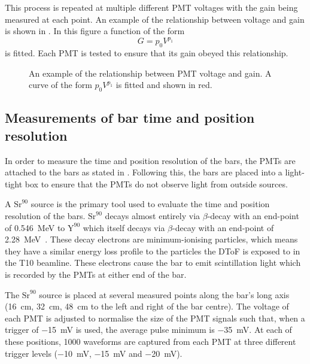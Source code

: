 This process is repeated at multiple different PMT voltages with the gain being measured at each point.
An example of the relationship between voltage and gain is shown in .
In this figure a function of the form
\begin{equation}
  G = p_{0} V^{p_{1}}
\end{equation}
is fitted.
Each PMT is tested to ensure that its gain obeyed this relationship.

\begin{figure}[h]
  \centering
  \begin{adjustbox}{max totalsize={.8\textwidth}, center}
    
  \end{adjustbox}
  \caption[Example of relationship between PMT voltage and gain]{An example of the relationship between PMT voltage and gain. A curve of the form $p_{0} V^{p_{1}}$ is fitted and shown in red.}
  \label{fig:gainEx}
\end{figure}

\subsection{Measurements of bar time and position resolution}
\label{ch:hptpc_dtof_characterisation:characterisation:barRes}

In order to measure the time and position resolution of the bars, the PMTs are attached to the bars as stated in .
Following this, the bars are placed into a light-tight box to ensure that the PMTs do not observe light from outside sources.

A $\text{Sr}^{90}$ source is the primary tool used to evaluate the time and position resolution of the bars.
$\text{Sr}^{90}$ decays almost entirely via $\beta$-decay with an end-point of \SI{0.546}{\mega\electronvolt} to $\text{Y}^{90}$ which itself decays via $\beta$-decay with an end-point of \SI{2.28}{\mega\electronvolt}~\cite{strontium}.
These decay electrons are minimum-ionising particles, which means they have a similar energy loss profile to the particles the DToF is exposed to in the T10 beamline.
These electrons cause the bar to emit scintillation light which is recorded by the PMTs at either end of the bar.

The $\text{Sr}^{90}$ source is placed at several measured points along the bar's long axis (\SI{16}{\cm}, \SI{32}{\cm}, \SI{48}{\cm} to the left and right of the bar centre).
The voltage of each PMT is adjusted to normalise the size of the PMT signals such that, when a trigger of \SI{-15}{\milli\volt} is used, the average pulse minimum is \SI{-35}{\milli\volt}.
At each of these positions, 1000 waveforms are captured from each PMT at three different trigger levels (\SI{-10}{\milli\volt}, \SI{-15}{\milli\volt} and \SI{-20}{\milli\volt}).

